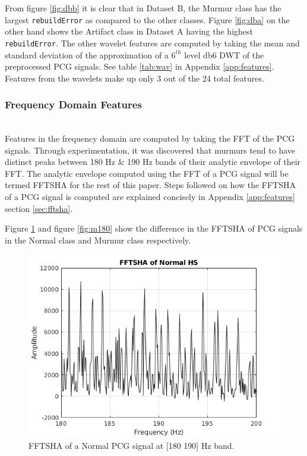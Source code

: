 \documentclass[10pt,twocolumn]{witseiepaper}
\begin{document}
From figure \ref{fig:dbb} it is clear that in Dataset B, the Murmur class has the largest \texttt{rebuildError} as compared to the other classes. Figure \ref{fig:dba} on the other hand shows the Artifact class in Dataset A having the highest \texttt{rebuildError}. The other wavelet features are computed by taking the mean and standard deviation of the approximation of a $6^{th}$ level db6 DWT of the preprocessed PCG signals. See table \ref{tab:wav} in Appendix \ref{app:features}. Features from the wavelets make up only 3 out of the 24 total features.


\subsubsection{Frequency Domain Features}
\textcolor{white}{Ke ea ipitsang Jehova...}\\
Features in the frequency domain are computed by taking the FFT of the PCG signals. Through experimentation, it was discovered that murmurs tend to have distinct peaks between 180 Hz \& 190 Hz bands of their analytic envelope of their FFT. The analytic envelope computed using the FFT of a PCG signal will be termed FFTSHA for the rest of this paper. Steps followed on how the FFTSHA of a PCG signal is computed are explained concisely in Appendix \ref{app:features} section \ref{sec:fftsha}. 

Figure \ref{fig:n180} and figure \ref{fig:m180} show the difference in the FFTSHA of PCG signals in the Normal class and Murmur class respectively.

\begin{figure}[h!]
    \centering
    \includegraphics[scale=0.45]{./fftsha_n.png}
    \caption{FFTSHA of a Normal PCG signal at [180 190] Hz band.}
    \label{fig:n180}
\end{figure}
\end{document}
